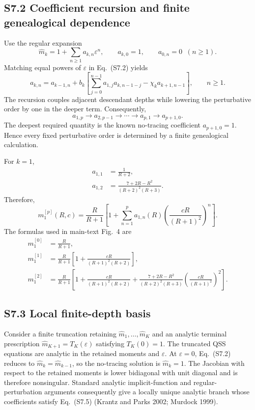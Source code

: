 \documentclass[9pt,a4paper]{article}
\begin{document}
\subsection*{S7.2 Coefficient recursion and finite genealogical dependence}

Use the regular expansion
\begin{equation}
\widehat m_k=1+\sum_{n\geq1}a_{k,n}\varepsilon^n,
\qquad a_{k,0}=1,
\qquad a_{0,n}=0\;\;(n\geq1).
\tag{S7.4}
\end{equation}
Matching equal powers of $\varepsilon$ in Eq.~(S7.2) yields
\begin{equation}
a_{k,n}=a_{k-1,n}+b_k\left[\sum_{j=0}^{n-1}a_{1,j}a_{k,n-1-j}-\chi_ka_{k+1,n-1}\right],
\qquad n\geq1.
\tag{S7.5}
\end{equation}
The recursion couples adjacent descendant depths while lowering the perturbative order by one in the deeper term. Consequently,
\[
a_{1,p}\longrightarrow a_{2,p-1}\longrightarrow\cdots\longrightarrow a_{p,1}\longrightarrow a_{p+1,0}.
\]
The deepest required quantity is the known no-tracing coefficient $a_{p+1,0}=1$. Hence every fixed perturbative order is determined by a finite genealogical calculation.

For $k=1$,
\begin{align}
a_{1,1}&=\frac{1}{R+2},
\tag{S7.6}\\
a_{1,2}&=\frac{7+2R-R^2}{(R+2)^2(R+3)}.
\tag{S7.7}
\end{align}
Therefore,
\begin{equation}
m_1^{[p]}(R,c)=\frac{R}{R+1}\left[1+\sum_{n=1}^{p}a_{1,n}(R)\left(\frac{cR}{(R+1)^2}\right)^n\right].
\tag{S7.8}
\end{equation}
The formulas used in main-text Fig.~4 are
\begin{align}
m_1^{[0]}&=\frac{R}{R+1},
\tag{S7.9a}\\
m_1^{[1]}&=\frac{R}{R+1}\left[1+\frac{cR}{(R+1)^2(R+2)}\right],
\tag{S7.9b}\\
m_1^{[2]}&=\frac{R}{R+1}\left[1+\frac{cR}{(R+1)^2(R+2)}+\frac{7+2R-R^2}{(R+2)^2(R+3)}\left(\frac{cR}{(R+1)^2}\right)^2\right].
\tag{S7.9c}
\end{align}

\subsection*{S7.3 Local finite-depth basis}

Consider a finite truncation retaining $\widehat m_1,\ldots,\widehat m_K$ and an analytic terminal prescription $\widehat m_{K+1}=T_K(\varepsilon)$ satisfying $T_K(0)=1$. The truncated QSS equations are analytic in the retained moments and $\varepsilon$. At $\varepsilon=0$, Eq.~(S7.2) reduces to $\widehat m_k=\widehat m_{k-1}$, so the no-tracing solution is $\widehat m_k=1$. The Jacobian with respect to the retained moments is lower bidiagonal with unit diagonal and is therefore nonsingular. Standard analytic implicit-function and regular-perturbation arguments consequently give a locally unique analytic branch whose coefficients satisfy Eq.~(S7.5) (Krantz and Parks 2002; Murdock 1999).
\end{document}
